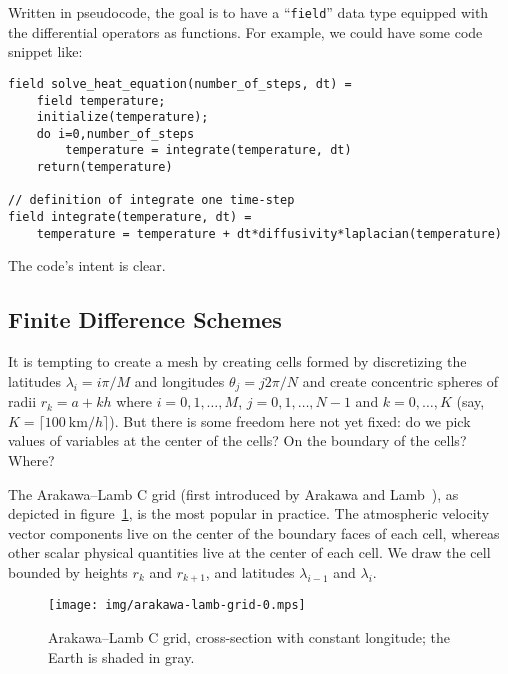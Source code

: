 Written in pseudocode, the goal is to have a ``{\tt field}'' data type
equipped with the differential operators as functions. For example, we
could have some code snippet like:

\begin{Verbatim}
field solve_heat_equation(number_of_steps, dt) =
    field temperature;
    initialize(temperature);
    do i=0,number_of_steps 
        temperature = integrate(temperature, dt)
    return(temperature)

// definition of integrate one time-step
field integrate(temperature, dt) =
    temperature = temperature + dt*diffusivity*laplacian(temperature)
\end{Verbatim}
\noindent%
The code's intent is clear. 

%

\subsection{Finite Difference Schemes}
It is tempting to create a mesh by creating cells formed by discretizing
the latitudes $\lambda_{i} = i\pi/M$ and longitudes $\theta_{j}=j2\pi/N$
and create concentric spheres of radii $r_{k} = a + kh$ where
$i=0,1,\dots,M$, $j=0,1,\dots,N-1$ and $k=0,\dots,K$ (say, $K = \lceil\SI{100}{\kilo\meter}/h\rceil$).
But there is some freedom here not yet fixed: do we pick values of
variables at the center of the cells? On the boundary of the cells? Where?

The Arakawa--Lamb C grid (first introduced by Arakawa and Lamb~\cite{ARAKAWA1977173}), as depicted in
figure~\ref{fig:intro:arakawa-lamb-c-grid}, is the most popular in
practice. The atmospheric velocity vector components live on the center
of the boundary faces of each cell, whereas other scalar physical
quantities live at the center of each cell. We draw the cell bounded by
heights $r_{k}$ and $r_{k+1}$, and latitudes $\lambda_{i-1}$ and $\lambda_{i}$.

\begin{figure}[h]\label{fig:intro:arakawa-lamb-c-grid}
  \centering
  \texttt{[image: img/arakawa-lamb-grid-0.mps]}
  \caption{Arakawa--Lamb C grid, cross-section with constant longitude;
    the Earth is shaded in gray.}
\end{figure}

